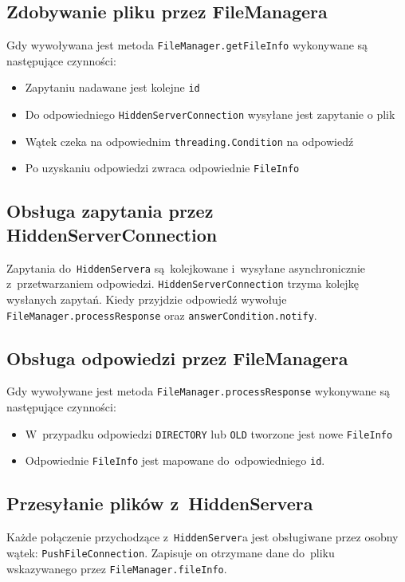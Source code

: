 \documentclass[a4paper,notitlepage]{article}
\begin{document}
\subsection{Zdobywanie pliku przez FileManagera}
Gdy wywoływana jest metoda \texttt{FileManager.getFileInfo} 
wykonywane są następujące czynności:
\begin{itemize}
\item Zapytaniu nadawane jest kolejne \texttt{id}
\item Do odpowiedniego \texttt{HiddenServerConnection} wysyłane jest zapytanie 
o plik
\item Wątek czeka na odpowiednim \texttt{threading.Condition} na odpowiedź
\item Po uzyskaniu odpowiedzi zwraca odpowiednie \texttt{FileInfo}
\end{itemize}

\subsection{Obsługa zapytania przez HiddenServerConnection}
Zapytania do~\texttt{HiddenServera} są~kolejkowane i~wysyłane
asynchronicznie z~przetwarzaniem odpowiedzi. 
\texttt{Hid\-den\-Server\-Connection}
trzyma kolejkę wysłanych zapytań. Kiedy przyjdzie odpowiedź wywołuje 
\texttt{File\-Manager\-.process\-Response} oraz \texttt{answerCondition.notify}.

\subsection{Obsługa odpowiedzi przez FileManagera}
Gdy wywoływane jest metoda \texttt{FileManager.processResponse}
wykonywane są następujące czynności:
\begin{itemize}
\item W~przypadku odpowiedzi \texttt{DIRECTORY} lub \texttt{OLD} tworzone jest 
nowe \texttt{FileInfo}
\item Odpowiednie \texttt{FileInfo} jest mapowane do~odpowiedniego 
\texttt{id}.
\end{itemize}

\subsection{Przesyłanie plików z~HiddenServera}
Każde połączenie przychodzące z~\texttt{HiddenServer}a jest obsługiwane przez
osobny wątek: \texttt{PushFileConnection}. Zapisuje on otrzymane dane do~pliku
wskazywanego przez \texttt{FileManager.fileInfo}.
\end{document}
